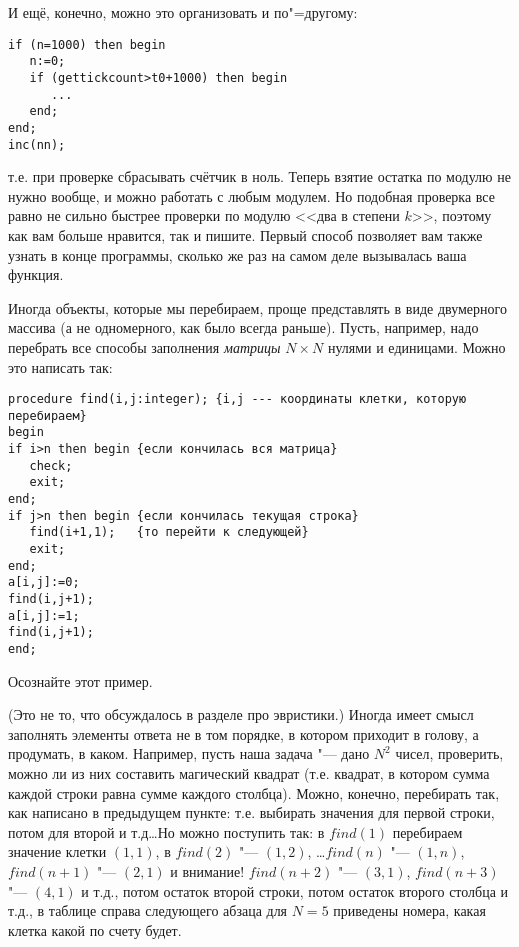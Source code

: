 И ещё, конечно, можно это организовать и по"=другому:
\begin{codesampleo}\begin{verbatim}
if (n=1000) then begin
   n:=0;
   if (gettickcount>t0+1000) then begin
      ...
   end;
end;
inc(nn);
\end{verbatim}\end{codesampleo}
т.е. при проверке сбрасывать счётчик в ноль. Теперь взятие остатка по модулю не нужно вообще, и можно работать с любым модулем. Но подобная проверка все равно не сильно быстрее проверки по модулю <<два в степени $k$>>, поэтому как вам больше нравится, так и пишите. Первый способ позволяет вам также узнать в конце программы, сколько же раз на самом деле вызывалась ваша функция.

 Иногда объекты, которые мы перебираем, проще представлять в виде двумерного 
массива (а не одномерного, как было всегда раньше). Пусть, например, надо 
перебрать все способы заполнения \textit{матрицы} $N\times N$ нулями и единицами. Можно это 
написать так:

\begin{codesampleo}\begin{verbatim}
procedure find(i,j:integer); {i,j --- координаты клетки, которую перебираем}
begin
if i>n then begin {если кончилась вся матрица}
   check;
   exit;
end;
if j>n then begin {если кончилась текущая строка}
   find(i+1,1);   {то перейти к следующей} 
   exit;
end;
a[i,j]:=0;
find(i,j+1);
a[i,j]:=1;
find(i,j+1);
end;
\end{verbatim}\end{codesampleo}

Осознайте этот пример.

(Это не то, что обсуждалось в разделе про эвристики.) Иногда имеет смысл 
заполнять элементы ответа не в том порядке, в котором приходит в голову, а продумать, 
в каком. Например, пусть наша задача "--- дано $N^2$ чисел, проверить, можно ли из 
них составить магический квадрат (т.е. квадрат, в котором сумма каждой строки 
равна сумме каждого столбца). Можно, конечно, перебирать так, как написано в 
предыдущем пункте: т.е. выбирать значения для первой строки, потом для второй и 
т.д\dots Но можно поступить так: в $find(1)$ перебираем значение клетки $(1,1)$, в 
$find(2)$ "--- $(1,2)$, \dots $find(n)$ "--- $(1,n)$, $find(n+1)$ "--- $(2,1)$ и внимание! 
$find(n+2)$ "--- $(3,1)$, $find(n+3)$ "--- $(4,1)$ и т.д., потом остаток второй строки, 
потом остаток второго столбца и т.д., в таблице справа следующего абзаца для $N=5$ приведены номера, какая клетка какой по счету будет.

